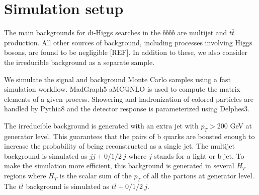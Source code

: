 
\section{Simulation setup}
\label{sec:sim}

The main backgrounds for di-Higgs searches in the $b\overline{b}b\overline{b}$ are multijet and $t\overline{t}$ production. All other sources of background, including processes involving Higgs bosons, are found to be negligible [REF]. In addition to these, we also consider the irreducible background as a separate sample.

We simulate the signal and background Monte Carlo samples using a fast simulation workflow. MadGraph5 aMC@NLO is used to compute the matrix elements of a given process. Showering and hadronization of colored particles are handled by Pythia8 and the detector response is parameterized using Delphes3. 

The irreducible background is generated with an extra jet with $p_T>200$ GeV at generator level. This guarantees that the pairs of b quarks are boosted enough to increase the probability of being reconstructed as a single jet. The multijet background is simulated as $jj+0/1/2~j$ where $j$ stands for a light or b jet. To make the simulation more efficient, this background is generated in several $H_T$ regions where $H_T$ is the scalar sum of the $p_T$ of all the partons at generator level. The $t\overline{t}$ background is simulated as $t\overline{t}+0/1/2~j$. 